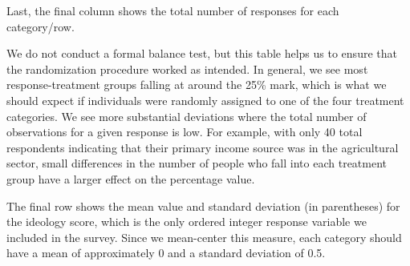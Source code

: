 \documentclass[
  10,
  letterpaper,
  DIV=11,
  numbers=noendperiod]{scrartcl}
\begin{document}
Last, the final column shows the total number of responses for each
category/row.

We do not conduct a formal balance test, but this table helps us to
ensure that the randomization procedure worked as intended. In general,
we see most response-treatment groups falling at around the 25\% mark,
which is what we should expect if individuals were randomly assigned to
one of the four treatment categories. We see more substantial deviations
where the total number of observations for a given response is low. For
example, with only 40 total respondents indicating that their primary
income source was in the agricultural sector, small differences in the
number of people who fall into each treatment group have a larger effect
on the percentage value.

The final row shows the mean value and standard deviation (in
parentheses) for the ideology score, which is the only ordered integer
response variable we included in the survey. Since we mean-center this
measure, each category should have a mean of approximately 0 and a
standard deviation of 0.5.
\end{document}
